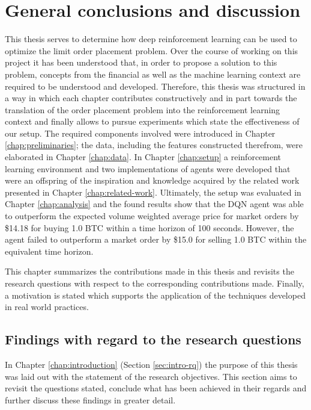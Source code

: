 \chapter{General conclusions and discussion}
\label{chap:discussion}

This thesis serves to determine how deep reinforcement learning can be used to optimize the limit order placement problem.
Over the course of working on this project it has been understood that, in order to propose a solution to this problem, concepts from the financial as well as the machine learning context are required to be understood and developed.
Therefore, this thesis was structured in a way in which each chapter contributes constructively and in part towards the translation of the order placement problem into the reinforcement learning context and finally allows to pursue experiments which state the effectiveness of our setup.
The required components involved were introduced in Chapter \ref{chap:preliminaries}; the data, including the features constructed therefrom, were elaborated in Chapter \ref{chap:data}.
In Chapter \ref{chap:setup} a reinforcement learning environment and two implementations of agents were developed that were an offspring of the inspiration and knowledge acquired by the related work presented in Chapter \ref{chap:related-work}.
Ultimately, the setup was evaluated in Chapter \ref{chap:analysis} and the found results show that the DQN agent was able to outperform the expected volume weighted average price for market orders by \$14.18 for buying 1.0 BTC within a time horizon of 100 seconds.
However, the agent failed to outperform a market order by \$15.0 for selling 1.0 BTC within the equivalent time horizon.

This chapter summarizes the contributions made in this thesis and revisits the research questions with respect to the corresponding contributions made.
Finally, a motivation is stated which supports the application of the techniques developed in real world practices.



\section{Findings with regard to the research questions}

In Chapter \ref{chap:introduction} (Section \ref{sec:intro-rq}) the purpose of this thesis was laid out with the statement of the research objectives.
This section aims to revisit the questions stated, conclude what has been achieved in their regards and further discuss these findings in greater detail.

